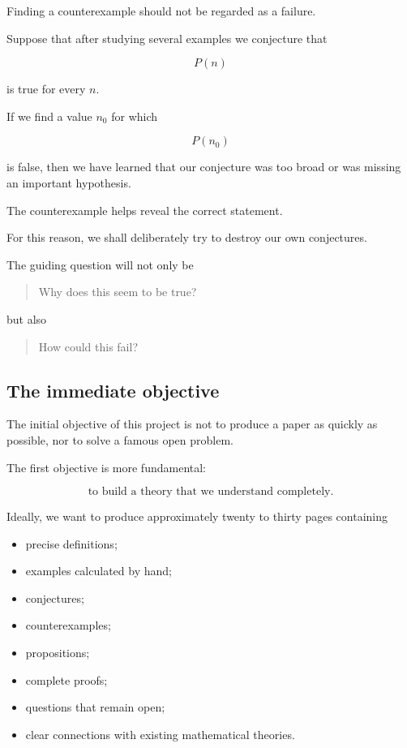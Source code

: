 Finding a counterexample should not be regarded as a failure.

Suppose that after studying several examples we conjecture that

\[
P(n)
\]

is true for every \(n\).

If we find a value \(n_0\) for which

\[
P(n_0)
\]

is false, then we have learned that our conjecture was too broad or was
missing an important hypothesis.

The counterexample helps reveal the correct statement.

For this reason, we shall deliberately try to destroy our own conjectures.

The guiding question will not only be

\begin{quote}
Why does this seem to be true?
\end{quote}

but also

\begin{quote}
How could this fail?
\end{quote}

\subsection{The immediate objective}

The initial objective of this project is not to produce a paper as quickly
as possible, nor to solve a famous open problem.

The first objective is more fundamental:

\[
\boxed{
\text{to build a theory that we understand completely.}
}
\]

Ideally, we want to produce approximately twenty to thirty pages containing

\begin{itemize}

    \item precise definitions;

    \item examples calculated by hand;

    \item conjectures;

    \item counterexamples;

    \item propositions;

    \item complete proofs;

    \item questions that remain open;

    \item clear connections with existing mathematical theories.

\end{itemize}

